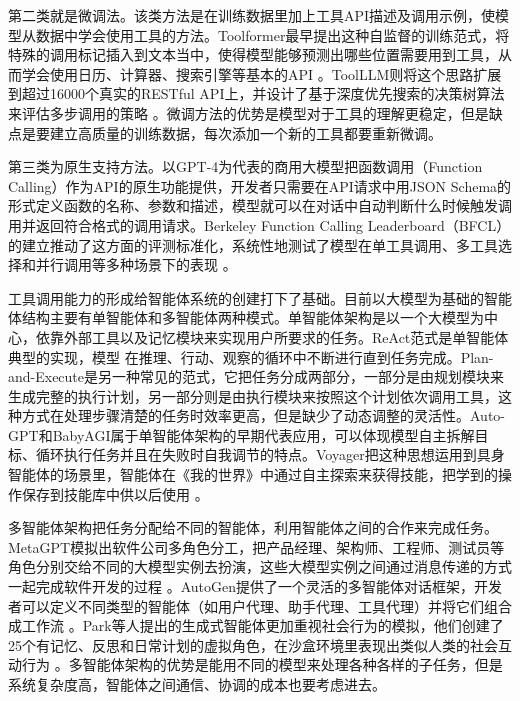 第二类就是微调法。该类方法是在训练数据里加上工具API描述及调用示例，使模型从数据中学会使用工具的方法。Toolformer最早提出这种自监督的训练范式，将特殊的调用标记插入到文本当中，使得模型能够预测出哪些位置需要用到工具，从而学会使用日历、计算器、搜索引擎等基本的API 。ToolLLM则将这个思路扩展到超过16000个真实的RESTful API上，并设计了基于深度优先搜索的决策树算法来评估多步调用的策略 。微调方法的优势是模型对于工具的理解更稳定，但是缺点是要建立高质量的训练数据，每次添加一个新的工具都要重新微调。

第三类为原生支持方法。以GPT-4为代表的商用大模型把函数调用（Function Calling）作为API的原生功能提供，开发者只需要在API请求中用JSON Schema的形式定义函数的名称、参数和描述，模型就可以在对话中自动判断什么时候触发调用并返回符合格式的调用请求。Berkeley Function Calling Leaderboard（BFCL）的建立推动了这方面的评测标准化，系统性地测试了模型在单工具调用、多工具选择和并行调用等多种场景下的表现 。

工具调用能力的形成给智能体系统的创建打下了基础。目前以大模型为基础的智能体结构主要有单智能体和多智能体两种模式。单智能体架构是以一个大模型为中心，依靠外部工具以及记忆模块来实现用户所要求的任务。ReAct范式是单智能体典型的实现，模型
在推理、行动、观察的循环中不断进行直到任务完成。Plan-and-Execute是另一种常见的范式，它把任务分成两部分，一部分是由规划模块来生成完整的执行计划，另一部分则是由执行模块来按照这个计划依次调用工具，这种方式在处理步骤清楚的任务时效率更高，但是缺少了动态调整的灵活性。Auto-GPT和BabyAGI属于单智能体架构的早期代表应用，可以体现模型自主拆解目标、循环执行任务并且在失败时自我调节的特点。Voyager把这种思想运用到具身智能体的场景里，智能体在《我的世界》中通过自主探索来获得技能，把学到的操作保存到技能库中供以后使用 。

多智能体架构把任务分配给不同的智能体，利用智能体之间的合作来完成任务。MetaGPT模拟出软件公司多角色分工，把产品经理、架构师、工程师、测试员等角色分别交给不同的大模型实例去扮演，这些大模型实例之间通过消息传递的方式一起完成软件开发的过程 。AutoGen提供了一个灵活的多智能体对话框架，开发者可以定义不同类型的智能体（如用户代理、助手代理、工具代理）并将它们组合成工作流 。Park等人提出的生成式智能体更加重视社会行为的模拟，他们创建了25个有记忆、反思和日常计划的虚拟角色，在沙盒环境里表现出类似人类的社会互动行为 。多智能体架构的优势是能用不同的模型来处理各种各样的子任务，但是系统复杂度高，智能体之间通信、协调的成本也要考虑进去。

